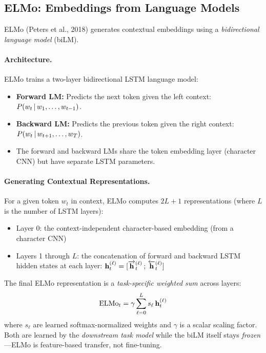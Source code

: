 \subsection{ELMo: Embeddings from Language Models}

ELMo (Peters et al., 2018) generates contextual embeddings using a
\emph{bidirectional language model} (biLM).

\paragraph{Architecture.}
ELMo trains a two-layer bidirectional LSTM language model:
\begin{itemize}
    \item \textbf{Forward LM:} Predicts the next token given the left context:
    $P(w_t \,|\, w_1, \ldots, w_{t-1})$.
    \item \textbf{Backward LM:} Predicts the previous token given the right
    context: $P(w_t \,|\, w_{t+1}, \ldots, w_T)$.
    \item The forward and backward LMs share the token embedding layer
    (character CNN) but have separate LSTM parameters.
\end{itemize}

\paragraph{Generating Contextual Representations.}
For a given token $w_t$ in context, ELMo computes $2L + 1$ representations
(where $L$ is the number of LSTM layers):
\begin{itemize}
    \item Layer 0: the context-independent character-based embedding
    (from a character CNN)
    \item Layers 1 through $L$: the concatenation of forward and backward LSTM
    hidden states at each layer:
    $\mathbf{h}_t^{(\ell)} = [\overrightarrow{\mathbf{h}}_t^{(\ell)} \,;\,
                       \overleftarrow{\mathbf{h}}_t^{(\ell)}]$
\end{itemize}

The final ELMo representation is a \emph{task-specific weighted sum} across
layers:
\[
    \text{ELMo}_t = \gamma \sum_{\ell=0}^{L} s_\ell \, \mathbf{h}_t^{(\ell)}
\]
where $s_\ell$ are learned softmax-normalized weights and $\gamma$ is a
scalar scaling factor.  Both are learned by the \emph{downstream task model}
while the biLM itself stays \emph{frozen}---ELMo is feature-based transfer,
not fine-tuning.

